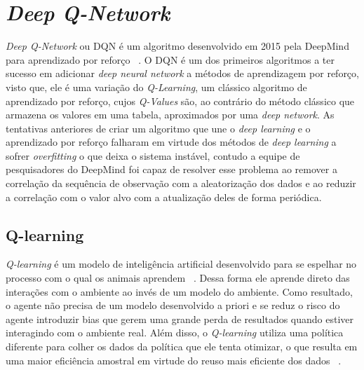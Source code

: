 

\chapter{\emph{Deep Q-Network}}
\label{cap:dqn}


\enlargethispage{.5\baselineskip}
\emph{Deep Q-Network} ou DQN é um algoritmo desenvolvido em 2015 pela DeepMind para aprendizado por reforço ~\citep{Human-level-control}. O DQN é um dos primeiros algoritmos a ter sucesso em adicionar \emph{deep neural network} a métodos de aprendizagem por reforço, visto que, ele é uma variação do \emph{Q-Learning}, um clássico algoritmo de aprendizado por reforço, cujos \emph{Q-Values} são, ao contrário do método clássico que armazena os valores em uma tabela, aproximados por uma \emph{deep network}. As tentativas anteriores de criar um algoritmo que une o \emph{deep learning} e o aprendizado por reforço falharam em virtude dos métodos de \emph{deep learning} a sofrer \emph{overfitting} o que deixa o sistema instável, contudo a equipe de pesquisadores do DeepMind foi capaz de resolver esse problema ao remover a correlação da sequência de observação com a aleatorização dos dados e ao reduzir a correlação com o valor alvo com a atualização deles de forma periódica.

\section{Q-learning}
\label{sec:q-learning}

\enlargethispage{.5\baselineskip}

\emph{Q-learning} é um modelo de inteligência artificial desenvolvido para se espelhar no processo com o qual os animais aprendem ~\citep{Watkins:PhD}. Dessa forma ele aprende direto das interações com o ambiente ao invés de um modelo do ambiente. Como resultado, o agente não precisa de um modelo desenvolvido a priori e se reduz o risco do agente introduzir bias que gerem uma grande perda de resultados quando estiver interagindo com o ambiente real. Além disso, o \emph{Q-learning} utiliza uma política diferente para colher os dados da política que ele tenta otimizar, o que resulta em uma maior eficiência amostral em virtude do reuso mais eficiente dos dados ~\citep{Nguyen_La_2019}.


